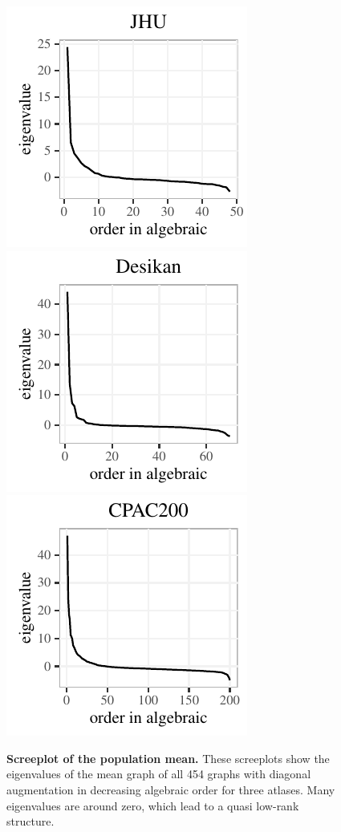 \documentclass[10pt,letterpaper]{article}
\begin{document}
\begin{figure}[!htbp]
\centering
\includegraphics[height=.2\textheight]{screeplot_JHU.pdf} 
\includegraphics[height=.2\textheight]{screeplot_desikan.pdf} 
\includegraphics[height=.2\textheight]{screeplot_CPAC200.pdf}
\caption{{\bf Screeplot of the population mean.}
These screeplots show the eigenvalues of the mean graph of all 454 graphs with diagonal augmentation in decreasing algebraic order for three atlases. Many eigenvalues are around zero, which lead to a quasi low-rank structure.
}
\label{fig:screeplot}
\end{figure}
\end{document}
